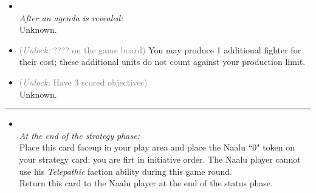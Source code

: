 \begin{multicols}{2}

\begin{itemize}
\item {}\\
\emph{After an agenda is revealed:}\\
Unknown.
\item {} \textcolor{gray}{(\emph{Unlock:} ???? on the game board)} %
You may produce 1 additional fighter for their cost; these additional units do not count against your production limit.
\item {} \textcolor{gray}{(\emph{Unlock:} Have 3 scored objectives)}\\
Unknown.
\end{itemize}

\vspace{-10pt}\rule{\hsize}{0.4pt}\vspace{5pt}


\begin{itemize}
\item {}\\
\emph{At the end of the strategy phase:}\\
Place this card faceup in your play area and place the Naalu ``0" token on your strategy card; you are firt in initiative order. The Naalu player cannot use his \emph{Telepathic} faction ability during this game round.\\
Return this card to the Naalu player at the end of the status phase.
\end{itemize}

\end{multicols}



